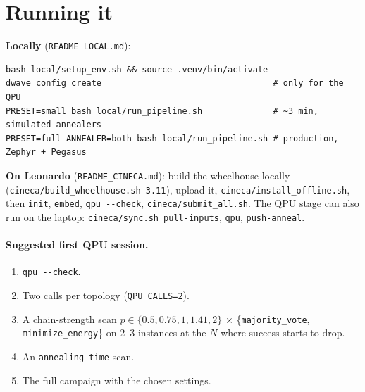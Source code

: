 \documentclass[11pt,a4paper]{article}
\newcommand{\code}[1]{\nolinkurl{#1}}
\begin{document}
\section{Running it}
\textbf{Locally} (\code{README_LOCAL.md}):
\begin{lstlisting}
bash local/setup_env.sh && source .venv/bin/activate
dwave config create                                  # only for the QPU
PRESET=small bash local/run_pipeline.sh              # ~3 min, simulated annealers
PRESET=full ANNEALER=both bash local/run_pipeline.sh # production, Zephyr + Pegasus
\end{lstlisting}
\textbf{On Leonardo} (\code{README_CINECA.md}): build the wheelhouse locally (\code{cineca/build_wheelhouse.sh 3.11}),
upload it, \code{cineca/install_offline.sh}, then \code{init}, \code{embed}, \code{qpu --check}, \code{cineca/submit_all.sh}.
The QPU stage can also run on the laptop: \code{cineca/sync.sh pull-inputs}, \code{qpu}, \code{push-anneal}.

\paragraph{Suggested first QPU session.}
\begin{enumerate}
\item \code{qpu --check}.
\item Two calls per topology (\code{QPU_CALLS=2}).
\item A chain-strength scan $p\in\{0.5,0.75,1,1.41,2\}$ $\times$ \{\code{majority_vote}, \code{minimize_energy}\} on 2--3 instances at the $N$ where success starts to drop.
\item An \code{annealing_time} scan.
\item The full campaign with the chosen settings.
\end{enumerate}

\appendix
\end{document}
